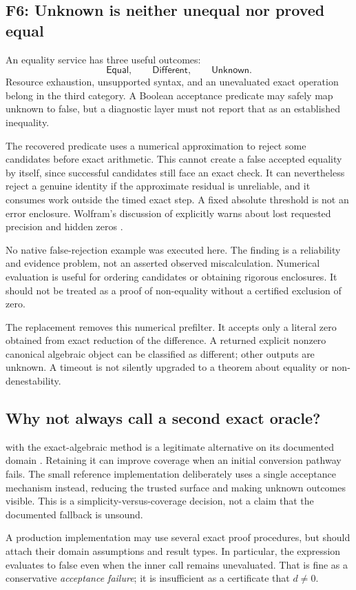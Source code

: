 \documentclass[11pt,letterpaper]{article}
\numberwithin{equation}{section}
\theoremstyle{definition}\newtheorem{definition}[theorem]{Definition}
\theoremstyle{remark}\newtheorem{remark}[theorem]{Remark}
\newcommand{\code}[1]{\texttt{\detokenize{#1}}}
\newcommand{\finding}[2]{\subsection{#1: #2}}
\begin{document}
\finding{F6}{Unknown is neither unequal nor proved equal}
An equality service has three useful outcomes:
\[
 \mathsf{Equal},\qquad\mathsf{Different},\qquad\mathsf{Unknown}.
\]
Resource exhaustion, unsupported syntax, and an unevaluated exact operation belong in the third category. A Boolean acceptance predicate may safely map unknown to false, but a diagnostic layer must not report that as an established inequality.

The recovered predicate uses a numerical approximation to reject some candidates before exact arithmetic. This cannot create a false accepted equality by itself, since successful candidates still face an exact check. It can nevertheless reject a genuine identity if the approximate residual is unreliable, and it consumes work outside the timed exact step. A fixed absolute threshold is not an error enclosure. Wolfram's discussion of \code{$MaxExtraPrecision} explicitly warns about lost requested precision and hidden zeros \cite{wl-precision}.

No native false-rejection example was executed here. The finding is a reliability and evidence problem, not an asserted observed miscalculation. Numerical evaluation is useful for ordering candidates or obtaining rigorous enclosures. It should not be treated as a proof of non-equality without a certified exclusion of zero.

The replacement removes this numerical prefilter. It accepts only a literal zero obtained from exact reduction of the difference. A returned explicit nonzero canonical algebraic object can be classified as different; other outputs are unknown. A timeout is not silently upgraded to a theorem about equality or non-denestability.

\subsection{Why not always call a second exact oracle?}
\code{PossibleZeroQ} with the exact-algebraic method is a legitimate alternative on its documented domain \cite{wl-zero}. Retaining it can improve coverage when an initial conversion pathway fails. The small reference implementation deliberately uses a single acceptance mechanism instead, reducing the trusted surface and making unknown outcomes visible. This is a simplicity-versus-coverage decision, not a claim that the documented fallback is unsound.

A production implementation may use several exact proof procedures, but should attach their domain assumptions and result types. In particular, the expression \code{RootReduce[d] === 0} evaluates to false even when the inner call remains unevaluated. That is fine as a conservative \emph{acceptance failure}; it is insufficient as a certificate that $d\ne0$.
\end{document}
